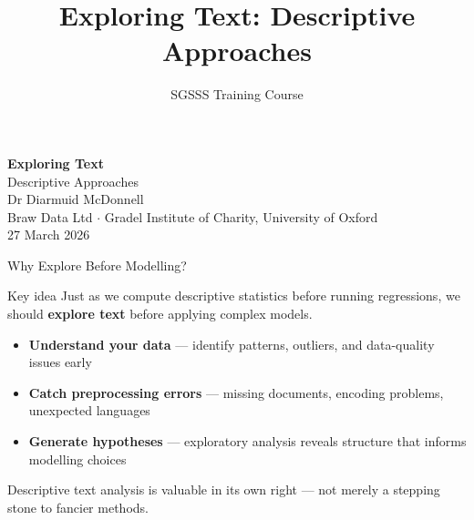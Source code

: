 \documentclass[aspectratio=169]{beamer}
\title{Exploring Text: Descriptive Approaches}
\subtitle{SGSSS Training Course}
\begin{document}
{
\begin{frame}[plain]
    \begin{center}
        \vspace{1.5cm}
        {\Large\bfseries\color{sgsssMagenta} Exploring Text}\\[0.3cm]
        {\large Descriptive Approaches}\\[0.8cm]
        {\normalsize Dr Diarmuid McDonnell}\\[0.1cm]
        {\small Braw Data Ltd \(\cdot\) Gradel Institute of Charity, University of Oxford}\\[0.3cm]
        {\small 27 March 2026}
    \end{center}
\end{frame}
}

\begin{frame}{Why Explore Before Modelling?}
    \begin{alertblock}{Key idea}
        Just as we compute descriptive statistics before running regressions, we should \textbf{explore text} before applying complex models.
    \end{alertblock}

    \begin{itemize}\setlength\itemsep{0pt}
        \item {} \textbf{Understand your data} --- identify patterns, outliers, and data-quality issues early
        \item {} \textbf{Catch preprocessing errors} --- missing documents, encoding problems, unexpected languages
        \item {} \textbf{Generate hypotheses} --- exploratory analysis reveals structure that informs modelling choices
    \end{itemize}

    \vspace{0.2cm}
    {\small Descriptive text analysis is valuable in its own right --- not merely a stepping stone to fancier methods.}
\end{frame}
\end{document}
